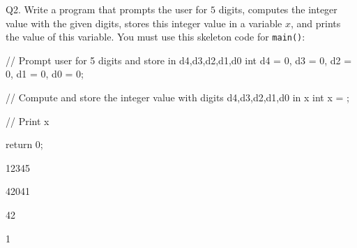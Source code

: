 Q2.
Write a program that prompts the user for $5$ digits, computes the integer value with the given digits, stores this integer value in a variable $x$, and prints the value of this variable. You must use this skeleton code for \verb!main()!:

\begin{console}[commandchars=\\\{\}]
// Prompt user for 5 digits and store in d4,d3,d2,d1,d0
int d4 = 0, d3 = 0, d2 = 0, d1 = 0, d0 = 0;


// Compute and store the integer value with digits d4,d3,d2,d1,d0 in x
int x = \underline{                                                     };


// Print x

return 0;
\end{console}

\resett
\nextt
\begin{console}[commandchars=\\\{\}]
12345
\end{console}

\nextt
\begin{console}[commandchars=\\\{\}]
42041
\end{console}

\nextt
\begin{console}[commandchars=\\\{\}]
42
\end{console}

\nextt
\begin{console}[commandchars=\\\{\}]
1
\end{console}
